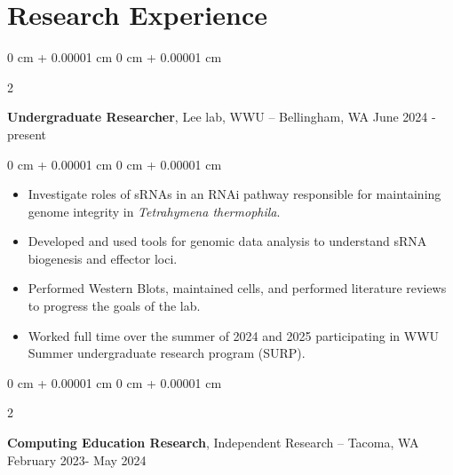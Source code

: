 \documentclass[10pt, article]{article}
\newenvironment{highlights}{
    \begin{itemize}[
        topsep=0.10 cm,
        parsep=0.10 cm,
        partopsep=0pt,
        itemsep=0pt,
        leftmargin=0 cm + 10pt
    ]
}{
    \end{itemize}
} %
\newenvironment{onecolentry}{
    \begin{adjustwidth}{
        0 cm + 0.00001 cm
    }{
        0 cm + 0.00001 cm
    }
}{
    \end{adjustwidth}
} %
\newenvironment{twocolentry}[2][]{
    \onecolentry
    \def\secondColumn{#2}
    \setcolumnwidth{\fill, 4.5 cm}
    \begin{paracol}{2}
}{
    \switchcolumn \raggedleft \secondColumn
    \end{paracol}
    \endonecolentry
} %
\begin{document}
    \section{Research Experience}




        \begin{twocolentry}{
            June 2024 - present
        }
            \textbf{Undergraduate Researcher}, Lee lab, WWU -- Bellingham, WA\end{twocolentry}

        \vspace{0.10 cm}
        \begin{onecolentry}
            \begin{highlights}
            \item Investigate roles of sRNAs in an RNAi pathway responsible for maintaining genome integrity in \textit{Tetrahymena thermophila}.
            \item Developed and used tools for genomic data analysis to understand sRNA biogenesis and effector loci.
            \item Performed Western Blots, maintained cells, and performed literature reviews to progress the goals of the lab.
            \item Worked full time over the summer of 2024 and 2025 participating in WWU Summer undergraduate research program (SURP).

            \end{highlights}
        \end{onecolentry}


        \vspace{0.2 cm}

        \begin{twocolentry}{
            February 2023- May 2024
        }
            \textbf{Computing Education Research}, Independent Research -- Tacoma, WA\end{twocolentry}
\end{document}
